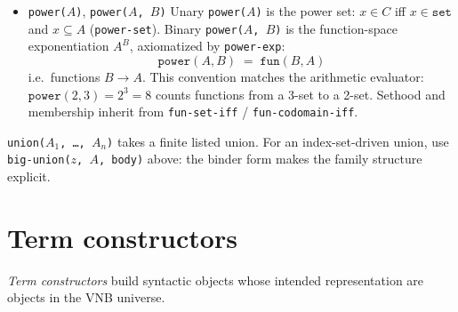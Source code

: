 \begin{itemize}
  \begin{remark}
  Lists, numbers and functions are objects of the single-sorted
  universe: a list that is defined is a set (all its components are
  sets, and so is any component of a list belonging to a class,
  axiom \texttt{tuple-members-are-sets}), and the number classes
  \texttt{nn}, \texttt{zz}, \texttt{qq}, \texttt{rr}, \texttt{cc} are
  primitive constants (Section~\ref{sec:primitives}), whose elements are
  characterised by axioms and not by a set-theoretic construction.  The binder form $\mathit{big\text{-}union}(z, A,
  \mathit{body})$ makes the family structure explicit: $A$ is the
  index, $z \mapsto \mathit{body}$ is intended to be set-valued.
  The ZF-style $\bigcup S$ over a loose ``set of sets'' is the special
  case $\mathit{big\text{-}union}(s, S, s)$ and is not taken as
  primitive.
  \end{remark}

\item \texttt{power($A$)}, \texttt{power($A$, $B$)}
  Unary \texttt{power($A$)} is the power set: $x \in C$ iff
  $x \in \mathtt{set}$ and $x \subseteq A$ (\texttt{power-set}).
  Binary \texttt{power($A$, $B$)} is the function-space exponentiation
  $A^B$, axiomatized by \texttt{power-exp}:
  \[
     \mathtt{power}(A, B) \;=\; \mathtt{fun}(B, A)
  \]
  i.e.\ functions $B \to A$.  This convention matches the arithmetic
  evaluator: $\texttt{power}(2, 3) = 2^3 = 8$ counts functions from
  a 3-set to a 2-set.  Sethood and membership inherit from
  \texttt{fun-set-iff} / \texttt{fun-codomain-iff}.

\end{itemize}

\begin{remark}
\texttt{union($A_1$, \ldots, $A_n$)} takes a finite listed union.
For an index-set-driven union, use \texttt{big-union($z$, $A$, body)}
above: the binder form makes the family structure explicit.
\end{remark}

\section{Term constructors}
\label{sec:choice-iota-lambda}

\emph{Term constructors} build syntactic objects whose intended
representation are objects in the VNB universe.

